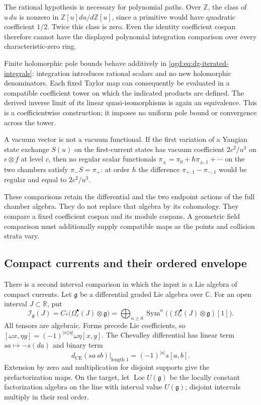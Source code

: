 The rational hypothesis is necessary for polynomial paths. Over
\(\mathbb Z\), the class of \(u\,du\) is nonzero in
\(\mathbb Z[u]du/d\mathbb Z[u]\), since a primitive would have
quadratic coefficient \(1/2\). Twice this class is zero. Even the
identity coefficient cospan therefore cannot have the displayed
polynomial integration comparison over every characteristic-zero ring.

Finite holomorphic pole bounds behave additively in
\eqref{ogd:eq:dg-iterated-integrals}: integration introduces rational
scalars and no new holomorphic denominators. Each fixed Taylor map
can consequently be evaluated in a compatible coefficient tower on
which the indicated products are defined. The derived inverse limit
of its linear quasi-isomorphisms is again an equivalence. This is a
coefficientwise construction; it imposes no uniform pole bound or
convergence across the tower.

A vacuum vector is not a vacuum functional. If the first variation of a
Yangian state exchange $S(u)$ on the first-current states has vacuum
coefficient $2c^2/u^3$ on $e\otimes f$ at level $c$, then no regular scalar
functionals $\pi_\pm=\pi_0+\hbar\pi_{\pm,1}+\cdots$ on the two chambers satisfy
$\pi_-S=\pi_+$: at order $\hbar$ the difference $\pi_{+,1}-\pi_{-,1}$ would be regular and
equal to $2c^2/u^3$.

These comparisons retain the differential and the two endpoint actions
of the full chamber algebra.
They do not replace that algebra by its cohomology.
They compare a fixed coefficient cospan and its module cospans.
A geometric field comparison must additionally supply compatible maps
as the points and collision strata vary.

\subsection{Compact currents and their ordered envelope}

There is a second interval comparison in which the input is a Lie
algebra of compact currents. Let \(\mathfrak g\) be a differential
graded Lie algebra over \(\mathbb C\). For an open interval
\(J\subset\mathbb R\), put
\begin{equation}\label{ogd:eq:compact-current-envelope}
 \mathcal I_{\mathfrak g}(J)=
 C_*\bigl(\Omega_c^\bullet(J)\otimes\mathfrak g\bigr)
 =\bigoplus_{n\geq0}
   \operatorname{Sym}^n\bigl((\Omega_c^\bullet(J)
                                      \otimes\mathfrak g)[1]\bigr).
\end{equation}
All tensors are algebraic. Forms precede Lie coefficients, so
\([\omega x,\eta y]=(-1)^{|x||\eta|}\omega\eta[x,y]\).
The Chevalley differential has linear term \(sa\mapsto-s(da)\)
and binary term
\[
 d_{\mathrm{CE}}(sa\,sb)\big|_{\text{length }1}
                         =(-1)^{|a|}s[a,b].
\]
Extension by zero and multiplication for disjoint supports give the
prefactorization maps. On the target, let
\(\operatorname{Loc}U(\mathfrak g)\) be the locally constant
factorization algebra on the line with interval value
\(U(\mathfrak g)\); disjoint intervals multiply in their real order.

